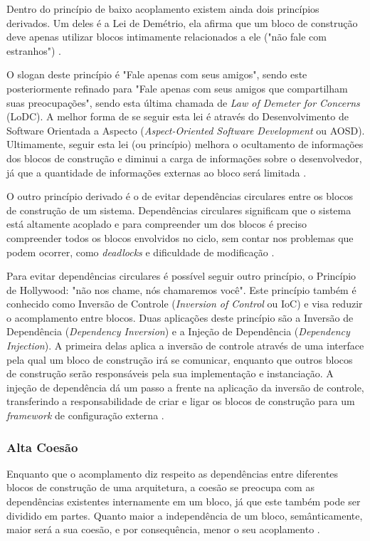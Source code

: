 \documentclass[diss]{template/setrem}
\begin{document}
Dentro do princípio de baixo acoplamento existem ainda dois princípios derivados. Um deles é a Lei de Demétrio, ela afirma que um bloco de construção deve apenas utilizar blocos intimamente relacionados a ele ("não fale com estranhos") \citep{Vogel2011}.

O slogan deste princípio é "Fale apenas com seus amigos", sendo este posteriormente refinado para "Fale apenas com seus amigos que compartilham suas preocupações", sendo esta última chamada de \emph{Law of Demeter for Concerns} (LoDC). A melhor forma de se seguir esta lei é através do Desenvolvimento de Software Orientada a Aspecto (\emph{Aspect-Oriented Software Development} ou AOSD). Ultimamente, seguir esta lei (ou princípio) melhora o ocultamento de informações dos blocos de construção e diminui a carga de informações sobre o desenvolvedor, já que a quantidade de informações externas ao bloco será limitada \citep{Lieberherr2012}.

O outro princípio derivado é o de evitar dependências circulares entre os blocos de construção de um sistema. Dependências circulares significam que o sistema está altamente acoplado e para compreender um dos blocos é preciso compreender todos os blocos envolvidos no ciclo, sem contar nos problemas que podem ocorrer, como \emph{deadlocks} e dificuldade de modificação \citep{Vogel2011}.

Para evitar dependências circulares é possível seguir outro princípio, o Princípio de Hollywood: "não nos chame, nós chamaremos você". Este princípio também é conhecido como Inversão de Controle (\emph{Inversion of Control} ou IoC) e visa reduzir o acomplamento entre blocos. Duas aplicações deste princípio são a Inversão de Dependência (\emph{Dependency Inversion}) e a Injeção de Dependência (\emph{Dependency Injection}). A primeira delas aplica a inversão de controle através de uma interface pela qual um bloco de construção irá se comunicar, enquanto que outros blocos de construção serão responsáveis pela sua implementação e instanciação. A injeção de dependência dá um passo a frente na aplicação da inversão de controle, transferindo a responsabilidade de criar e ligar os blocos de construção para um \emph{framework} de configuração externa \citep{Vogel2011}.

\subsubsection{Alta Coesão}
Enquanto que o acomplamento diz respeito as dependências entre diferentes blocos de construção de uma arquitetura, a coesão se preocupa com as dependências existentes internamente em um bloco, já que este também pode ser dividido em partes. Quanto maior a independência de um bloco, semânticamente, maior será a sua coesão, e por consequência, menor o seu acoplamento \citep{Vogel2011}.
\end{document}
